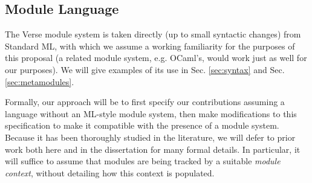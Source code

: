 
\subsection{Module Language}

The Verse module system is taken directly (up to small syntactic changes) from Standard ML, with which we assume a working familiarity for the purposes of this proposal \cite{harper1997programming,MacQueen:1984:MSM:800055.802036} (a related module system, e.g. OCaml's, would work just as well for our purposes). We will give examples of its use in Sec. \ref{sec:syntax} and Sec. \ref{sec:metamodules}.

Formally, our approach will be to first specify our contributions assuming a language without an ML-style module system, then make modifications to this specification to make it compatible with the presence of a module system. Because it has been thoroughly studied in the literature, we will defer to prior work both here and in the dissertation for many formal details. In particular, it will suffice to assume that modules are being tracked by a suitable \emph{module context}, without detailing how this context is populated. %




